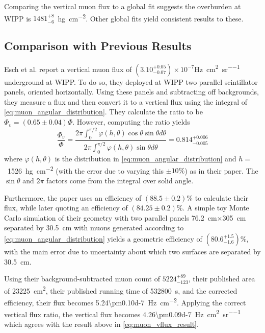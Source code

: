 \documentclass[herrin-thesis.tex]{subfiles}
\begin{document}
Comparing the vertical muon flux to a global fit\cite{Mei:2006qy} suggests the overburden at WIPP is \(1481^{+8}_{-6}\)~\si{\hecto\g\per\square\cm}. Other global fits\cite{Crouch:1987ij}\cite{miyake:1973} yield consistent results to these.

\subsection{Comparison with Previous Results}
Esch et al.\cite{Esch:2004zj} report a vertical muon flux of \((3.10^{+0.05}_{-0.07})\times10^{-7}\)\si{\Hz\per\square\cm\per\steradian} underground at WIPP. To do so, they deployed at WIPP two parallel scintillator panels, oriented horizontally. Using these panels and subtracting off backgrounds, they measure a flux and then convert it to a vertical flux using the integral of \cref{eq:muon_angular_distribution}. They calculate the ratio to be \(\Phi_v = (0.65\pm0.04)\Phi\). However, computing the ratio yields 
\begin{equation}
\label{eq:muon_esch_integral}
\frac{\Phi_v}{\Phi} = \frac{2 \pi \int_0^{\pi/2} \varphi(h,\theta)\cos\theta\sin\theta d\theta}{2 \pi \int_0^{\pi/2} \varphi(h,\theta)\sin\theta d\theta} = 0.814^{+0.006}_{-0.005}
\end{equation}
where \(\varphi(h,\theta)\) is the distribution in \cref{eq:muon_angular_distribution} and \(h = \)~\SI{1526}{\hecto\gram\per\square\cm} (with the error due to varying this \(\pm10\%\)) as in their paper. The \(\sin\theta\) and \(2 \pi\) factors come from the integral over solid angle.

Furthermore, the paper uses an efficiency of \((88.5\pm0.2)\%\) to calculate their flux, while later quoting an efficiency of \((84.25\pm0.2)\%\). A simple toy Monte Carlo simulation of their geometry with two parallel panels \SI{76.2}{\cm}\(\times\)\SI{305}{\cm} separated by \SI{30.5}{\cm} with muons generated according to \cref{eq:muon_angular_distribution} yields a geometric efficiency of \((80.6^{+1.5}_{-1.6})\%\), with the main error due to uncertainty about which two surfaces are separated by \SI{30.5}{\cm}.

Using their background-subtracted muon count of \(5224^{+89}_{-123}\), their published area of \SI{23225}{\square\cm}, their published running time of \SI{532800}{s}, and the corrected efficiency, their flux becomes \SI{5.24\pm0.10d-7}{\Hz\per\square\cm}. Applying the correct vertical flux ratio, the vertical flux becomes \SI{4.26\pm0.09d-7}{\Hz\per\square\cm\per\steradian} which agrees with the result above in \cref{eq:muon_vflux_result}.

%
%
\end{document}
